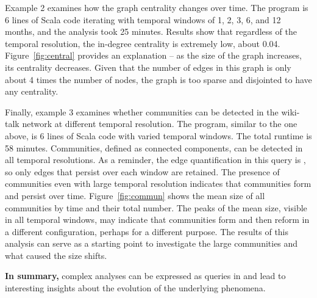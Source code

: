 Example 2 examines how the graph centrality changes over time.  The
program is 6 lines of Scala code iterating with temporal windows of 1,
2, 3, 6, and 12 months, and the analysis took 25 minutes.  Results
show that regardless of the temporal resolution, the in-degree
centrality is extremely low, about 0.04.  Figure~\ref{fig:central}
provides an explanation -- as the size of the graph increases, its
centrality decreases.  Given that the number of edges in this graph is
only about 4 times the number of nodes, the graph is too sparse and
disjointed to have any centrality.



Finally, example 3 examines whether communities can be detected in the
wiki-talk network at different temporal resolution.  The program,
similar to the one above, is 6 lines of Scala code with varied
temporal windows.  The total runtime is 58 minutes.  Communities,
defined as connected components, can be detected in all temporal
resolutions.  As a reminder, the edge quantification in this query is
, so only edges that persist over each window are
retained.  The presence of communities even with large temporal
resolution indicates that communities form and persist over time.
Figure~\ref{fig:commun} shows the mean size of all communities by time
and their total number.  The peaks of the mean size, visible in all
temporal windows, may indicate that communities form and then reform
in a different configuration, perhaps for a different purpose.  The
results of this analysis can serve as a starting point to investigate
the large communities and what caused the size shifts.

{\bf In summary,} complex analyses can be expressed as queries in \ql
and lead to interesting insights about the evolution of the underlying
phenomena.
